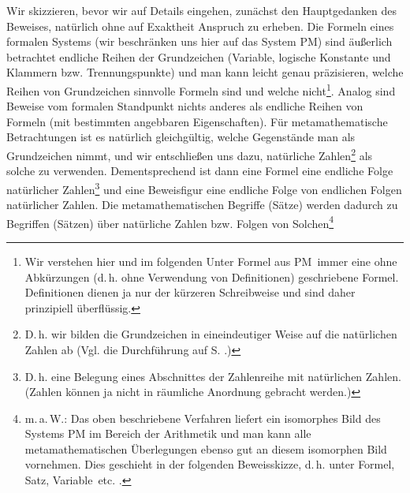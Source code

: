 \documentclass[draft]{scrartcl}
\newcounter{commentaryNumber}
\begin{document}
Wir skizzieren, bevor wir auf Details eingehen, zunächst
den Hauptgedanken des Beweises, natürlich ohne auf
Exaktheit Anspruch zu erheben. Die Formeln eines formalen Systems (wir beschränken uns hier auf das System PM) sind
äußerlich betrachtet endliche Reihen der Grundzeichen
(Variable, logische Konstante und Klammern bzw.
Trennungspunkte) und man kann leicht genau präzisieren,
welche Reihen von Grundzeichen sinnvolle Formeln sind
und welche nicht\footnote{Wir verstehen hier und im folgenden
Unter \glqq Formel aus PM\grqq\ immer eine ohne Abkürzungen
(d.\,h. ohne Verwendung von Definitionen)
geschriebene Formel. Definitionen dienen ja nur der kürzeren
Schreibweise und sind daher prinzipiell überflüssig.}.
Analog sind Beweise vom formalen Standpunkt nichts
anderes
als endliche Reihen von Formeln (mit bestimmten angebbaren
Eigenschaften). Für metamathematische Betrachtungen
ist es natürlich gleichgültig, welche Gegenstände man
als Grundzeichen nimmt, und wir entschließen uns dazu,
natürliche Zahlen\footnote{D.\,h. wir bilden die Grundzeichen
in eineindeutiger Weise auf die natürlichen Zahlen ab (Vgl. die Durchführung auf S. \pageref{grundzeichenzahlen}.)}
als solche zu verwenden. Dementsprechend ist dann eine
Formel eine endliche Folge natürlicher
Zahlen\footnote{D.\,h. eine Belegung eines Abschnittes der
Zahlenreihe mit natürlichen Zahlen. (Zahlen können ja nicht in
räumliche Anordnung gebracht werden.)} und eine Beweisfigur eine
endliche Folge von endlichen Folgen natürlicher Zahlen.
Die metamathematischen Begriffe (Sätze) werden dadurch zu
Begriffen (Sätzen) über natürliche Zahlen bzw. Folgen von
Solchen\footnote{m.\,a.\,W.: Das oben beschriebene Verfahren
liefert ein isomorphes Bild des Systems PM im Bereich der
Arithmetik und man kann alle metamathematischen Überlegungen
ebenso gut an diesem isomorphen Bild vornehmen. Dies geschieht
in der folgenden Beweisskizze, d.\,h. unter \glqq Formel\grqq,
\glqq Satz\grqq, \glqq Variable\grqq\ etc.
.}
\end{document}
